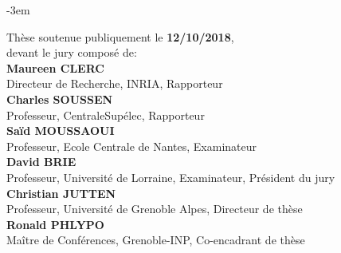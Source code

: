 \begin{titlepage}
\begin{adjustwidth}{}{-3em}
\begin{flushleft}
\begin{flushright}
\begin{minipage}{\leftshift}
\begin{flushleft}
{Thèse soutenue publiquement le \textbf{12/10/2018},\\ devant le jury composé de:}\\[\espvert]
{\textbf{Maureen CLERC}}\\
{Directeur de Recherche, INRIA, Rapporteur}\\ %
{\textbf{Charles SOUSSEN}}\\
{Professeur, CentraleSupélec, Rapporteur}\\ %
{\textbf{Saïd MOUSSAOUI}}\\
{Professeur, Ecole Centrale de Nantes, Examinateur}\\ %
{\textbf{David BRIE}}\\
{Professeur, Université de Lorraine, Examinateur, Président du jury}\\ %
{\textbf{Christian JUTTEN}}\\
{Professeur, Université de Grenoble Alpes, Directeur de thèse}\\ %
{\textbf{Ronald PHLYPO}}\\
{Maître de Conférences, Grenoble-INP, Co-encadrant de thèse}\\ %
\end{flushleft}
\end{minipage}
\end{flushright}
\vfill
\end{flushleft}
\end{adjustwidth}
\end{titlepage}
\setlength{\parskip}{10pt}
\endgroup

\cleardoublepage


